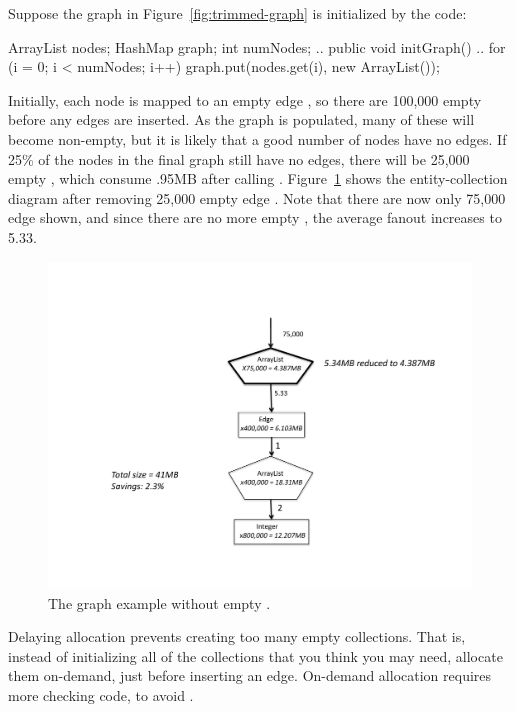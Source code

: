 Suppose the graph
in Figure~\ref{fig:trimmed-graph} is initialized by the code:
\begin{shortlisting}
ArrayList nodes;
HashMap graph;
int numNodes;
   ..
   public void initGraph() {
       ..
       for (i = 0; i < numNodes; i++) {
          graph.put(nodes.get(i), new ArrayList());
       }
   }
\end{shortlisting}
Initially, each node is mapped to an empty edge , so there
are 100,000 empty  before any edges are inserted.
As the graph is populated, many of these  will become
non-empty, but it is likely that a good number of nodes have no edges. 
If 25\% of the nodes in the final graph still have no edges, there will be
25,000 empty , which consume .95MB after calling
. Figure~\ref{fig:empty-array} shows the entity-collection
diagram after removing 25,000 empty edge . Note that
there are now only 75,000 edge  shown, and since there are
no more empty , the average fanout increases to 5.33. 
\begin{figure}
  \centering
 \includegraphics[width=.80\textwidth]{part1/Figures/collections/empty-array.pdf}
  \caption{The graph example without empty .}
  \label{fig:empty-array}
\end{figure}
 
 Delaying allocation prevents creating too many empty collections.
 That is, instead of initializing all of the collections that you think you
 may need, allocate them on-demand, just before inserting an edge. On-demand
 allocation requires more checking code, to avoid .
 
